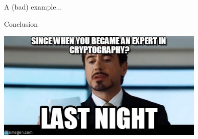 \documentclass[handout, xcolor=dvipsnames,aspectratio=169]{beamer}
\begin{document}
\begin{frame}{A (bad) example...}
    \pause

  \begin{figure}%
    \centering
  \pause
    \qquad
  \end{figure}

\end{frame}
\begin{frame}{Conclusion}

  \centering\includegraphics[width=10cm]{img/expert}


\end{frame}
\end{document}
